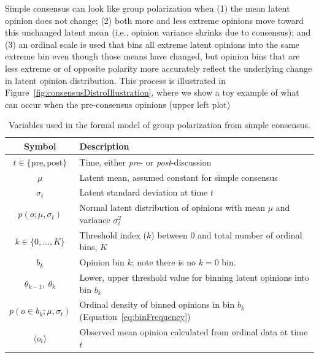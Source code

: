 \documentclass[11pt, letterpaper]{article}
\begin{document}
Simple consensus can look like group polarization when (1) the mean latent opinion
does not change; (2) both more and less extreme opinions move toward this 
unchanged latent mean (i.e., opinion variance shrinks due to consensus); 
and (3) an ordinal scale is used that bins all extreme
latent opinions into the same extreme bin even though those means have changed,
but opinion bins that are less extreme or of opposite polarity more accurately
reflect the underlying change in latent opinion distribution. This process is
illustrated in Figure~\ref{fig:consensusDistroIllustration}, where we show
a toy example of what can occur when the pre-consensus
opinions (upper left plot) 

\begin{table}[h]
  \caption{Variables used in the formal model of group polarization from simple consensus.}
  \label{tab:modelVariables}
  \begin{tabular}{cp{5.0in}} \toprule
   Symbol & Description  \\ \midrule  
   $t \in \{\mathrm{pre}, \mathrm{post}\}$ & Time, either \emph{pre}- or
                                           \emph{post}-discussion \\
   $\mu$  &   Latent mean, assumed constant for simple consensus \\ 
   $\sigma_t$ & Latent standard deviation at time $t$ \\
   $p(o;\mu,\sigma_t)$ & Normal latent distribution of opinions with mean
                         $\mu$ and variance $\sigma_t^2$ \\
   $k \in \{0,\ldots,K\} $ & Threshold index ($k$) between 0 and total number of
         ordinal bins, $K$ \\
   $b_k$ & Opinion bin $k$; note there is no $k=0$ bin. \\
   $\theta_{k-1},~\theta_k$  & Lower, upper threshold value for binning latent opinions into
     bin $b_k$ \\
   $p(o \in b_k; \mu, \sigma_t)$ & Ordinal density of binned opinions in bin $b_k$ 
            (Equation~\ref{eq:binFrequency}) \\
   $\langle o_t \rangle$  &   Observed mean opinion calculated from ordinal data at time $t$ \\
   \bottomrule
  \end{tabular} 
\end{table}
\end{document}
